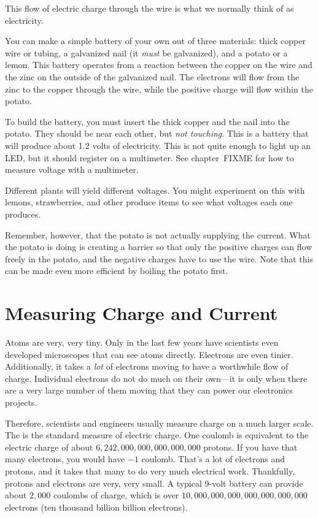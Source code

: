 This flow of electric charge through the wire is what we normally think of as electricity.

\begin{sidebar}
You can make a simple battery of your own out of three materials: thick copper wire or tubing, a galvanized nail (it \emph{must} be galvanized), and a potato or a lemon.
This battery operates from a reaction between the copper on the wire and the zinc on the outside of the galvanized nail.
The electrons will flow from the zinc to the copper through the wire, while the positive charge will flow within the potato.

To build the battery, you must insert the thick copper and the nail into the potato.  
They should be near each other, but \emph{not touching}.
This is a battery that will produce about 1.2 volts of electricity.
This is not quite enough to light up an LED, but it should register on a multimeter.  
See chapter~FIXME for how to measure voltage with a multimeter.

Different plants will yield different voltages.
You might experiment on this with lemons, strawberries, and other produce items to see what voltages each one produces.

Remember, however, that the potato is not actually supplying the current.
What the potato is doing is creating a barrier so that only the positive charges can flow freely in the potato, and the negative charges have to use the wire.
Note that this can be made even more efficient by boiling the potato first.
\end{sidebar}

\section{Measuring Charge and Current}

Atoms are very, very tiny.
Only in the last few years have scientists even developed microscopes that can see atoms directly.
Electrons are even tinier.
Additionally, it takes a \emph{lot} of electrons moving to have a worthwhile flow of charge.
Individual electrons do not do much on their own---it is only when there are a very large number of them moving that they can power our electronics projects.

Therefore, scientists and engineers usually measure charge on a much larger scale.
The  is the standard measure of electric charge.
One coulomb is equivalent to the electric charge of about $6,242,000,000,000,000,000$ protons.
If you have that many electrons, you would have $-1$ coulomb.
That's a lot of electrons and protons, and it takes that many to do very much electrical work.
Thankfully, protons and electrons are very, very small.
A typical 9-volt battery can provide about $2,000$ coulombs of charge, which is over $10,000,000,000,000,000,000,000$ electrons (ten thousand billion billion electrons).

